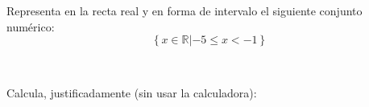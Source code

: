 \documentclass[addpoints,spanish, 12pt,a4paper]{exam}
\begin{document}
\begin{questions}

\question[1] Representa en la recta real y en forma de intervalo el siguiente conjunto numérico:
\addpoints %
$$\left\{ x \in \mathbb{R} \left| -5 \leqslant x < -1 \right. \right\}$$

\begin{solution}
$ $ 
\end{solution}

\question Calcula, justificadamente (sin usar la calculadora): 
\begin{parts}
%

\end{parts}
\end{questions}
\end{document}
